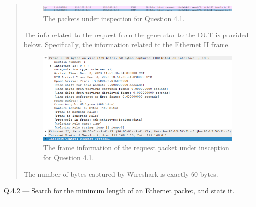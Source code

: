 \documentclass{article}
\newcommand\Que[2]{%
\begin{samepage}
\leavevmode\par
\noindent
Q.#1 --- #2\par\vspace{10pt}\hrule\vspace{10pt}
\end{samepage}}
\newenvironment{ans}
{\fbox{Answer}\begin{quote}\nopagebreak}
{\end{quote}}
\begin{document}
\begin{ans}
\begin{figure}[H]
\centering
\includegraphics[width=16cm]{data/q4.1-packets-under-inspection.png}
\caption{The packets under inspection for Question 4.1.}
\end{figure}

The info related to the request from the generator to the
DUT is provided below. Specifically, the information
related to the Ethernet II frame.

\begin{figure}[H]
\centering
\includegraphics[width=16cm]{data/q4.1-request-info.png}
\caption{The frame information of the request packet under
insception for Question 4.1.}
\end{figure}

The number of bytes captured by Wireshark is exactly 60 bytes.
\end{ans}

\Que{4.2}{Search for the minimum length of an Ethernet packet,
and state it.}
\end{document}

